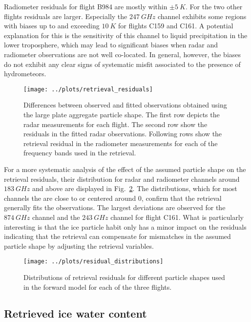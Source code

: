 \documentclass[journal abbreviation, manuscript]{copernicus}
\begin{document}
Radiometer residuals for flight B984 are mostly within $\pm 5\ \unit{K}$. For
the two other flights residuals are larger. Especially the $247\ \unit{GHz}$
channel exhibits some regions with biases up to and exceeding $10\ \unit{K}$ for
flights C159 and C161. A potential explanation for this is the sensitivity of
this channel to liquid precipitation in the lower troposphere, which may lead to
significant biases when radar and radiometer observations are not well
co-located. In general, however, the biases do not exhibit any clear signs of
systematic misfit associated to the presence of hydrometeors.

\begin{figure}[!hbpt]
  \centering
  \texttt{[image: ../plots/retrieval\_residuals]}
  \caption{Differences between observed and fitted observations obtained
    using the large plate aggregate particle shape. The first row depicts
    the radar measurements for each flight. The second row show the residuals
    in the fitted radar observations. Following rows show the retrieval residual
    in the radiometer measurements for each of the frequency bands used in
    the retrieval.
    }
  \label{fig:residuals}
\end{figure}

For a more systematic analysis of the effect of the assumed particle shape on
the retrieval residuals, their distribution for radar and radiometer channels
around $183\ \unit{GHz}$ and above are displayed in
Fig.~\ref{fig:residuals_box}. The distributions, which for most channels the are
close to or centered around 0, confirm that the retrieval generally fits the
observations. The largest deviations are observed for the $874\ \unit{GHz}$
channel and the $243\ \unit{GHz}$ channel for flight C161. What is particularly
interesting is that the ice particle habit only has a minor impact on the
residuals indicating that the retrieval can compensate for mismatches in the
assumed particle shape by adjusting the retrieval variables.


\begin{figure}[!hbpt]
  \centering
  \texttt{[image: ../plots/residual\_distributions]}
  \caption{Distributions of retrieval residuals for different particle
    shapes used in the forward model for each of the three flights.}
  \label{fig:residuals_box}
\end{figure}

\subsection{Retrieved ice water content}
\end{document}
